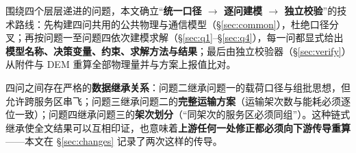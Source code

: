 围绕四个层层递进的问题，本文确立“\textbf{统一口径 $\to$ 逐问建模 $\to$ 独立校验}”的技术路线：先构建四问共用的公共物理与通信模型（\S\ref{sec:common}），杜绝口径分叉；再按问题一至问题四依次建模求解（\S\ref{sec:q1}--\S\ref{sec:q4}），每一问都显式给出\textbf{模型名称、决策变量、约束、求解方法与结果}；最后由独立校验器（\S\ref{sec:verify}）从附件与 DEM 重算全部物理量并与方案上报值比对。

四问之间存在严格的\textbf{数据继承关系}：问题二继承问题一的载荷口径与组批思想，但允许跨服务区串飞；问题三继承问题二的\textbf{完整运输方案}（运输架次数与能耗必须逐位一致）；问题四继承问题三的\textbf{架次划分}（“同架次的服务区必须同组”）。这种链式继承使全文结果可以互相印证，也意味着\textbf{上游任何一处修正都必须向下游传导重算}——本文在 \S\ref{sec:changes} 记录了两次这样的传导。

